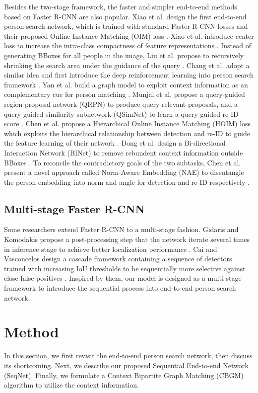 \documentclass[letterpaper]{article} \usepackage{aaai21}  \usepackage{times}  \usepackage{helvet} \usepackage{courier}  \usepackage[hyphens]{url}  \usepackage{graphicx} \urlstyle{rm} \def\UrlFont{\rm}  \usepackage{natbib}  \usepackage{caption} \usepackage{multirow}
\begin{document}
Besides the two-stage framework, the faster and simpler end-to-end methods based on Faster R-CNN are also popular. Xiao et al. design the first end-to-end person search network, which is trained with standard Faster R-CNN losses and their proposed Online Instance Matching (OIM) loss \cite{oim}. Xiao et al. introduce center loss to increase the intra-class compactness of feature representations \cite{ian}. Instead of generating BBoxes for all people in the image, Liu et al. propose to recursively shrinking the search area under the guidance of the query \cite{npsm}. Chang et al. adopt a similar idea and first introduce the deep reinforcement learning into person search framework \cite{rcaa}. Yan et al. build a graph model to exploit context information as an complementary cue for person matching \cite{context}. Munjal et al. propose a query-guided region proposal network (QRPN) to produce query-relevant proposals, and a query-guided similarity subnetwork (QSimNet) to learn a query-guided re-ID score \cite{qeeps}. Chen et al. propose a Hierarchical Online Instance Matching (HOIM) loss which exploits the hierarchical relationship between detection and re-ID to guide the feature learning of their network \cite{hoim}. Dong et al. design a Bi-directional Interaction Network (BINet) to remove rebundent context information outside BBoxes \cite{binet}. To reconcile the contradictory goals of the two subtasks, Chen et al. present a novel approach called Norm-Aware Embedding (NAE) to disentangle the person embedding into norm and angle for detection and re-ID respectively \cite{nae}.

\subsection{Multi-stage Faster R-CNN}
Some researchers extend Faster R-CNN to a multi-stage fashion. Gidaris and Komodakis propose a post-processing step that the network iterate several times in inference stage to achieve better localization performance \cite{iterative-bbox1,iterative-bbox2}. Cai and Vasconcelos design a cascade framework containing a sequence of detectors trained with increasing IoU thresholds to be sequentially more selective against close false positives \cite{cascade-rcnn}. Inspired by them, our model is designed as a multi-stage framework to introduce the sequential process into end-to-end person search network.

\section{Method}
In this section, we first revisit the end-to-end person search network, then discuss its shortcoming. Next, we describe our proposed Sequential End-to-end Network (SeqNet). Finally, we formulate a Context Bipartite Graph Matching (CBGM) algorithm to utilize the context information.
\end{document}
